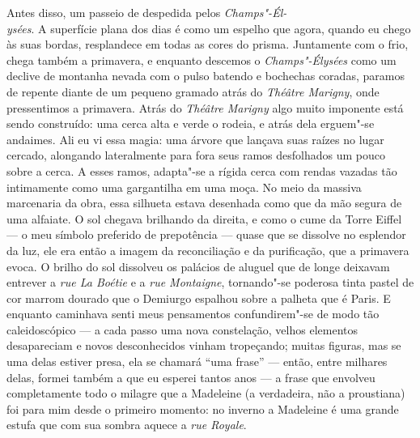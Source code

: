 Antes disso, um passeio de despedida pelos \emph{Champs"-Él-\\ysées}. A superfície
plana dos dias é como um espelho que agora, quando eu chego às suas
bordas, resplandece em todas as cores do prisma. Juntamente com o frio,
chega também a primavera, e enquanto descemos o \emph{Champs"-Élysées} como um
declive de montanha nevada com o pulso batendo e bochechas coradas,
paramos de repente diante de um pequeno gramado atrás do \emph{Théâtre
Marigny}, onde pressentimos a primavera. Atrás do \emph{Théâtre Marigny} algo
muito imponente está sendo construído: uma cerca alta e verde o rodeia,
e atrás dela erguem"-se andaimes. Ali eu vi essa magia: uma árvore que
lançava suas raízes no lugar cercado, alongando lateralmente para fora
seus ramos desfolhados um pouco sobre a cerca. A esses ramos, adapta"-se a
rígida cerca com rendas vazadas tão intimamente como uma gargantilha em
uma moça. No meio da massiva marcenaria da obra, essa silhueta estava
desenhada como que da mão segura de uma alfaiate. O sol chegava
brilhando da direita, e como o cume da Torre Eiffel --- o meu símbolo
preferido de prepotência --- quase que se dissolve no esplendor da luz, ele
era então a imagem da reconciliação e da purificação, que a primavera
evoca. O brilho do sol dissolveu os palácios de aluguel que de longe
deixavam entrever a \emph{rue La Boétie} e a \emph{rue Montaigne},
tornando"-se poderosa tinta pastel de cor marrom dourado que o Demiurgo
espalhou sobre a palheta que é Paris. E enquanto caminhava senti meus
pensamentos confundirem"-se de modo tão caleidoscópico --- a cada passo
uma nova constelação, velhos elementos desapareciam e novos
desconhecidos vinham tropeçando; muitas figuras, mas se uma delas
estiver presa, ela se chamará ``uma frase'' --- então, entre milhares
delas, formei também a que eu esperei tantos anos --- a frase que
envolveu completamente todo o milagre que a Madeleine (a verdadeira, não
a proustiana) foi para mim desde o primeiro momento: no inverno a
Madeleine é uma grande estufa que com sua sombra aquece a \emph{rue
Royale}.
